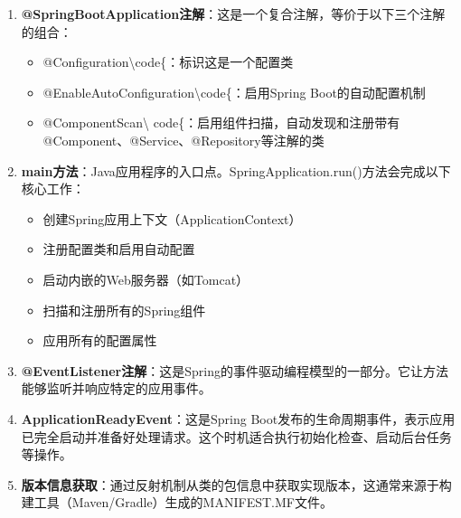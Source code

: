 \begin{enumerate} \def\labelenumi{\arabic{enumi}.} \item \textbf{@SpringBootApplication注解}：这是一个复合注解，等价于以下三个注解的组合：
\begin{itemize} \tightlist \item @Configuration\textbackslash code\{：标识这是一个配置类 \item
@EnableAutoConfiguration\textbackslash code\{：启用Spring Boot的自动配置机制 \item @ComponentScan\textbackslash
code\{：启用组件扫描，自动发现和注册带有@Component、@Service、@Repository等注解的类 \end{itemize} \item
\textbf{main方法}：Java应用程序的入口点。SpringApplication.run()方法会完成以下核心工作： \begin{itemize} \tightlist \item
创建Spring应用上下文（ApplicationContext） \item 注册配置类和启用自动配置 \item 启动内嵌的Web服务器（如Tomcat） \item 扫描和注册所有的Spring组件 \item 应用所有的配置属性
\end{itemize} \item \textbf{@EventListener注解}：这是Spring的事件驱动编程模型的一部分。它让方法能够监听并响应特定的应用事件。 \item
\textbf{ApplicationReadyEvent}：这是Spring Boot发布的生命周期事件，表示应用已完全启动并准备好处理请求。这个时机适合执行初始化检查、启动后台任务等操作。 \item
\textbf{版本信息获取}：通过反射机制从类的包信息中获取实现版本，这通常来源于构建工具（Maven/Gradle）生成的MANIFEST.MF文件。 \end{enumerate}
